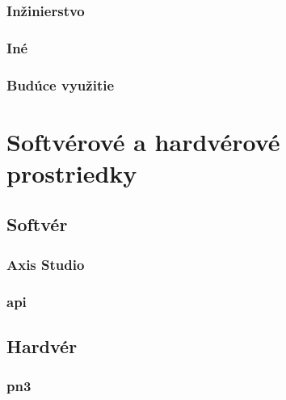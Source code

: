 \subsubsection{Inžinierstvo}

\subsubsection{Iné} %

\subsubsection{Budúce využitie} %

\section{Softvérové a hardvérové prostriedky}

\subsection{Softvér}

\subsubsection{Axis Studio}

\subsubsection{\acrshort{api}}

\subsection{Hardvér}\label{ssec:hw}

\subsubsection{\acrlong{pn3}}

